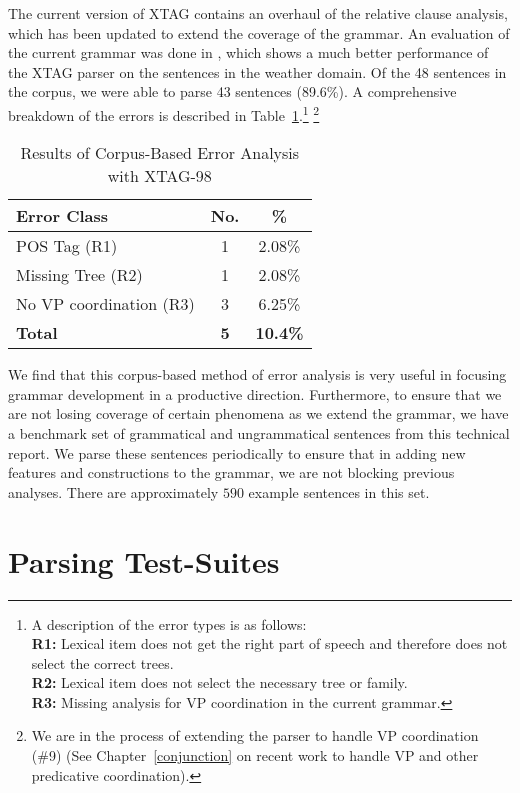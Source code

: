 The current version of {\sc XTAG} contains an overhaul of the relative
clause analysis, which has been updated to extend the coverage of the
grammar. An evaluation of the current grammar was done in
\cite{prasadandsarkar00}, which shows a much better performance of the {\sc
XTAG} parser on the sentences in the weather domain. Of the 48 sentences
in the corpus, we were able to parse 43 sentences (89.6\%). A comprehensive
breakdown of the errors is described in
Table~\ref{tab:weather_analysis}.\footnote{%
%
A description of the error types is as follows:\\
{\bf R1:} Lexical item does not get the right part of speech and therefore
does not select the correct trees.\\
{\bf R2:} Lexical item does not select the necessary tree or family.\\
{\bf R3:} Missing analysis for VP coordination in the current grammar.%
%
}
%
\footnote{We are in the process of extending the parser to handle VP
coordination (\#9) (See Chapter~\ref{conjunction} on recent work to handle
VP and other predicative coordination).%
%
}

\begin{table}[htb]
\centering
\begin{tabular}{|l|c|c|} \hline \hline
Error Class & No. & \% \\ \hline \hline
POS Tag (R1) & 1 & 2.08\% \\ \hline
Missing Tree (R2) & 1 & 2.08\% \\ \hline
No VP coordination (R3) & 3 & 6.25\% \\ \hline
{\bf Total} & {\bf 5} & {\bf 10.4\%} \\ \hline
\end{tabular}
\caption{\label{tab:weather_analysis} Results of Corpus-Based Error
Analysis with XTAG-98}
\end{table}

We find that this corpus-based method of error analysis is very useful in
focusing grammar development in a productive direction. Furthermore, to
ensure that we are not losing coverage of certain phenomena as we extend
the grammar, we have a benchmark set of grammatical and ungrammatical
sentences from this technical report. We parse these sentences periodically
to ensure that in adding new features and constructions to the grammar, we
are not blocking previous analyses.  There are approximately $590$ example
sentences in this set.

\section{Parsing Test-Suites}


